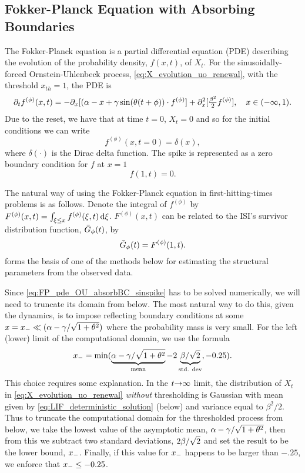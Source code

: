 \subsection{Fokker-Planck Equation with Absorbing Boundaries}
\label{sec:fp_estimation}
The Fokker-Planck equation is a partial differential equation (PDE) describing
the evolution of the probability density, $f(x,t)$, of $X_t$. 
For the sinusoidally-forced Ornstein-Uhlenbeck process,
\cref{eq:X_evolution_uo_renewal}, with the threshold $x_{th} = 1$, the PDE is
\begin{equation}
{\partial}_t f^{(\phi)}(x,t) = -{\partial}_x[(\alpha - x + {\gamma } \sin({ \theta} (t + \phi))\cdot
f^{(\phi)}] +{\partial}^2_x[ \tfrac{\beta^2}{2}f^{(\phi)}], \quad x \in (-\infty,
1).
\label{eq:FP_pde_OU_absorbBC_sinspike}
\end{equation}
Due to the reset, we have that at time $t=0$, $X_t=0$  and so for the initial
conditions we can write
\begin{equation}
f^{(\phi)}(x,t=0) = \delta(x) ,
\label{eq:PDF_ICs}
\end{equation}
where $\delta(\cdot)$ is the Dirac delta function. The spike is represented as
a zero boundary condition for $f$ at $x = 1$ $$
f(1, t) =0.
$$

The natural way of using the Fokker-Planck equation in first-hitting-times
problems is as follows. Denote the integral of $f^{(\phi)}$ by $F^{(\phi)}(x,t)
= \int_{\xi \leq x} f^{(\phi)}(\xi, t) \, \mathrm{d} \xi$. $F^{(\phi)}(x,t)$ can be
related to the ISI's survivor distribution function, ${ \bar{G} }_{\phi}(t)$, by
\begin{equation}
{ \bar{G} }_{\phi}(t) = F^{(\phi)}(1,t).
\label{eq:SDF_vs_F_at_thresh}
\end{equation}
 forms the
basis of one of the methods below for estimating the structural parameters from
the observed data.

Since \cref{eq:FP_pde_OU_absorbBC_sinspike} has to be solved numerically, we will need to
truncate its domain from below. The most natural way to do this, given the
dynamics, is to impose reflecting boundary conditions at some $x={ x_{-} } \ll
(\alpha-{\gamma }/\sqrt{1+{ \theta}^2})$ where the probability mass is very small. For the left
(lower) limit of the computational domain, we use the formula $$ { x_{-} } =
\min(\underbrace{\alpha -{\gamma }/\sqrt{1+{ \theta}^2}}_{\textrm{mean}} - 2 \underbrace{\beta/
\sqrt{2}}_{\textrm{std. dev}}, -0.25).$$ This choice requires some explanation.
In the $t{\rightarrow} \infty$ limit, the distribution of $X_t$ in
\cref{eq:X_evolution_uo_renewal} {\sl without} thresholding is Gaussian with
mean given by \cref{eq:LIF_deterministic_solution} (below) and variance equal to
$\beta^2/2$. Thus to truncate the computational
domain for the thresholded process from below, we take the lowest value of
the asymptotic mean, $\alpha - \gamma / \sqrt{1 + { \theta}^2}$, then from
this we subtract two standard deviations, $2\beta/\sqrt{2}$ and set the result to be the lower
bound, ${ x_{-} }$. Finally, if this value for ${ x_{-} }$ happens to be larger than
$-.25$, we enforce that  ${ x_{-} } \leq -0.25$. 


